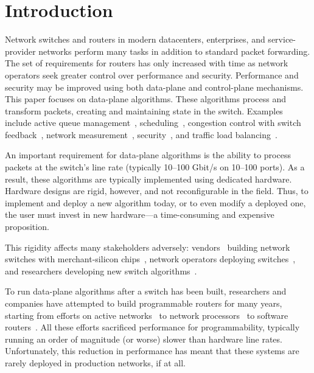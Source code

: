 \section{Introduction}
\label{s:intro}

Network switches and routers in modern datacenters, enterprises, and
service-provider networks perform many tasks in addition to standard
packet forwarding. The set of requirements for routers has only
increased with time as network operators seek greater control over
performance and security.  Performance and security may be improved
using both data-plane and control-plane mechanisms. This paper focuses
on data-plane algorithms. These algorithms process and transform
packets, creating and maintaining state in the switch. Examples
include active queue management~\cite{red,blue,avq,codel,pie},
scheduling~\cite{pifo_hotnets}, congestion control with switch
feedback~\cite{xcp, rcp, pdq, dctcp}, network
measurement~\cite{opensketch, bitmap_george, elephant_george},
security~\cite{dns_change}, and traffic load balancing~\cite{conga}.

An important requirement for data-plane algorithms is the ability to
process packets at the switch's line rate (typically 10--100 Gbit/s on
10--100 ports).  As a result, these
algorithms are typically implemented using dedicated
hardware. Hardware designs are rigid, however, and not reconfigurable
in the field. Thus, to implement and deploy a new algorithm today, or
to even modify a deployed one, the user must invest in new
hardware---a time-consuming and expensive proposition.

This rigidity affects many stakeholders adversely:
vendors~\cite{cisco_nexus, dell_force10, arista_7050} building network
switches with merchant-silicon chips~\cite{trident, tomahawk,
  mellanox}, network operators deploying
switches~\cite{google,facebook,vl2}, and researchers developing new
switch algorithms~\cite{xcp, codel, d3, detail, pdq}.  

To run data-plane algorithms after a switch has been built,
researchers and companies have attempted to build programmable routers
for many years, starting from efforts on active
networks~\cite{active-nets} to network processors~\cite{npu_survey} to
software routers~\cite{click, dpdk, routebricks}. All these efforts
sacrificed performance for programmability, typically running an order
of magnitude (or worse) slower than hardware line
rates. Unfortunately, this reduction in performance has meant that
these systems are rarely deployed in production networks, if at all.

